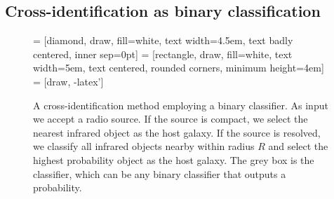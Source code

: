 \documentclass[fleqn,usenatbib,usedcolumn]{mnras}
\begin{document}
  \subsection{Cross-identification as binary
  classification}\label{cross-identification-as-binary-classification}
    \begin{figure}
      \centering
       = [diamond, draw, fill=white,
          text width=4.5em, text badly centered, inner sep=0pt]
       = [rectangle, draw, fill=white,
          text width=5em, text centered, rounded corners, minimum height=4em]
       = [draw, -latex']
      \caption{A cross-identification method employing a binary classifier. As
        input we accept a radio source. If the source is compact, we select
        the nearest infrared object as the host galaxy. If the source is
        resolved, we classify all infrared objects nearby within radius $R$
        and select the highest probability object as the host galaxy. The grey
        box is the classifier, which can be any binary classifier that outputs
        a probability.}
      \label{fig:flowchart}
    \end{figure}
\end{document}
